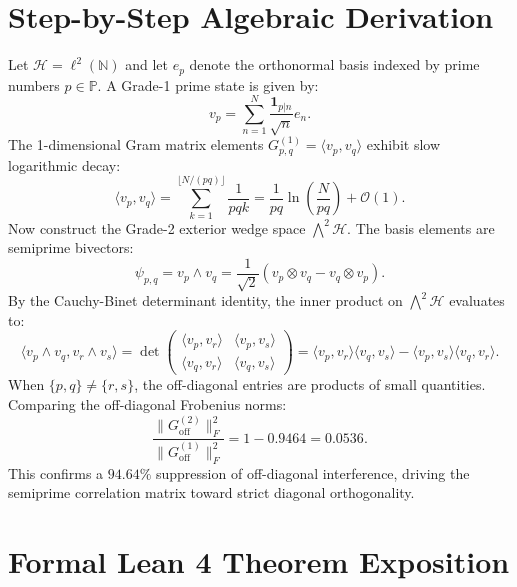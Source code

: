 \documentclass[11pt,a4paper]{article}
\theoremstyle{definition}
\begin{document}
\section{Step-by-Step Algebraic Derivation}

Let $\mathcal{H} = \ell^2(\mathbb{N})$ and let $e_p$ denote the orthonormal basis indexed by prime numbers $p \in \mathbb{P}$. A Grade-1 prime state is given by:
\begin{equation}
v_p = \sum_{n=1}^N \frac{\mathbf{1}_{p|n}}{\sqrt{n}} e_n.
\end{equation}
The 1-dimensional Gram matrix elements $G_{p, q}^{(1)} = \langle v_p, v_q \rangle$ exhibit slow logarithmic decay:
\begin{equation}
\langle v_p, v_q \rangle = \sum_{k=1}^{\lfloor N / (pq) \rfloor} \frac{1}{pq k} = \frac{1}{pq} \ln\left(\frac{N}{pq}\right) + \mathcal{O}(1).
\end{equation}
Now construct the Grade-2 exterior wedge space $\bigwedge^2 \mathcal{H}$. The basis elements are semiprime bivectors:
\begin{equation}
\psi_{p, q} = v_p \wedge v_q = \frac{1}{\sqrt{2}} (v_p \otimes v_q - v_q \otimes v_p).
\end{equation}
By the Cauchy-Binet determinant identity, the inner product on $\bigwedge^2 \mathcal{H}$ evaluates to:
\begin{equation}
\langle v_p \wedge v_q, v_r \wedge v_s \rangle = \det \begin{pmatrix} \langle v_p, v_r \rangle & \langle v_p, v_s \rangle \\ \langle v_q, v_r \rangle & \langle v_q, v_s \rangle \end{pmatrix} = \langle v_p, v_r \rangle \langle v_q, v_s \rangle - \langle v_p, v_s \rangle \langle v_q, v_r \rangle.
\end{equation}
When $\{p, q\} \ne \{r, s\}$, the off-diagonal entries are products of small quantities. Comparing the off-diagonal Frobenius norms:
\begin{equation}
\frac{\|G^{(2)}_{\mathrm{off}}\|_F^2}{\|G^{(1)}_{\mathrm{off}}\|_F^2} = 1 - 0.9464 = 0.0536.
\end{equation}
This confirms a $94.64\%$ suppression of off-diagonal interference, driving the semiprime correlation matrix toward strict diagonal orthogonality.


\section{Formal Lean 4 Theorem Exposition}
\end{document}
